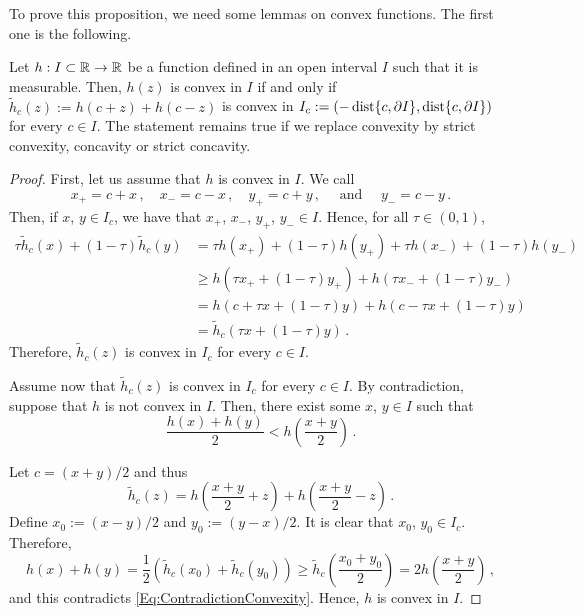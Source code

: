 To prove this proposition, we need some lemmas on convex functions. The first one is the following.

\begin{lemma}
\label{Lemma:Convex<->AllReflectionsConvex} Let $h: I \subset \mathbb{R} \to \mathbb{R}$ be a function defined in
an open interval $I$ such that it is measurable. Then, $h(z)$ is convex in $I$ if and only if
$\widetilde{h}_c(z) := h(c+z) + h(c-z)$ is convex in $I_c := (-\operatorname{dist}\{c, \partial I\}, \operatorname{dist}\{c,
\partial I\})$ for every $c\in I$. The statement remains true if we replace convexity by strict
convexity, concavity or strict concavity.
\end{lemma}

\begin{proof}
First, let us assume that $h$ is convex in $I$. We call
$$
x_+ = c + x\,, \quad x_- = c - x\,, \quad y_+ = c + y\,, \quad \textrm{ and } \quad y_- = c - y\,.
$$
Then, if $x$, $y\in I_c$, we have that $x_+$, $x_-$, $y_+$, $y_- \in I$. Hence, for all $\tau\in(0,1)$,
\begin{align*}
\tau\widetilde{h}_c(x) + (1-\tau)\widetilde{h}_c(y)
&=  \tau h(x_+) + (1-\tau )h(y_+) + \tau  h(x_-) + (1-\tau )h(y_-) \\
&\geq h(\tau x_+ + (1-\tau )y_+) + h(\tau x_- + (1-\tau )y_-) \\
&= h(c + \tau x + (1-\tau )y) + h(c-\tau x + (1-\tau )y) \\
& = \widetilde{h}_c(\tau x + (1-\tau )y)\,.
\end{align*}
Therefore, $\widetilde{h}_c(z)$ is convex in $I_c$ for every $c\in I$.

Assume now that $\widetilde{h}_c(z)$ is convex in $I_c$ for every $c\in I$. By contradiction,
suppose that $h$ is not convex in $I$. Then, there exist some $x$, $y\in I$ such that
\begin{equation}
\label{Eq:ContradictionConvexity}
\dfrac{h(x) + h(y)}{2} < h \left (\dfrac{x+y}{2}\right )\,.
\end{equation}

Let $c = (x+y)/2$ and thus
$$
\widetilde{h}_c(z) = h\left( \dfrac{x+y}{2} + z\right) +  h\left( \dfrac{x+y}{2} - z\right)\,.
$$
Define $ x_0 := (x-y)/2$ and $y_0:= (y-x)/2$. It is clear that $x_0$, $y_0\in I_c$. Therefore,
$$
h(x) + h(y) = \dfrac{1}{2} \left( \widetilde{h}_c(x_0) + \widetilde{h}_c(y_0)\right )
\geq \widetilde{h}_c \left( \dfrac{x_0 + y_0}{2}\right )
= 2 h \left (\dfrac{x+y}{2}\right )\,,
$$
and this contradicts \eqref{Eq:ContradictionConvexity}. Hence, $h$ is convex in $I$.
\end{proof}

